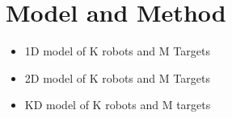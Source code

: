 \section{Model and Method}
\begin{itemize}
    \item 1D model of K robots and M Targets
    \item 2D model of K robots and M Targets
    \item KD model of K robots and M targets
\end{itemize}



